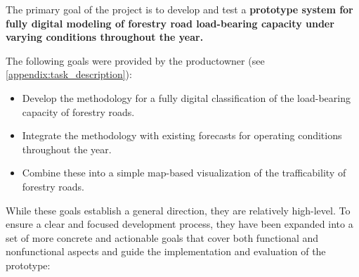 The primary goal of the project is to develop and test a \textbf{prototype system for fully digital modeling of forestry road load-bearing capacity under varying conditions throughout the year.}

The following goals were provided by the \Gls{productowner} (see \autoref{appendix:task_description}):
\begin{itemize}
    \item Develop the methodology for a fully digital classification of the load-bearing capacity of forestry roads.
    \item Integrate the methodology with existing forecasts for operating conditions throughout the year.
    \item Combine these into a simple map-based visualization of the trafficability of forestry roads.
\end{itemize}

While these goals establish a general direction, they are relatively high-level. To ensure a clear and focused development process, they have been expanded into a set of more concrete and actionable goals that cover both functional and nonfunctional aspects and guide the implementation and evaluation of the prototype: 

